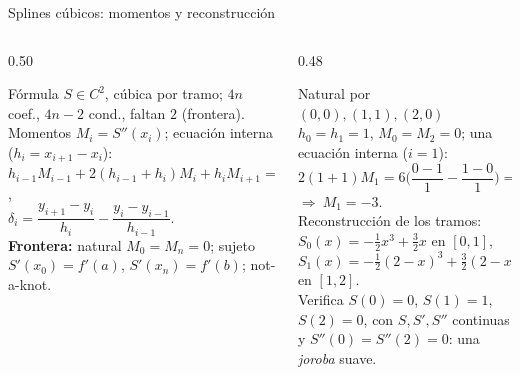 \documentclass[aspectratio=169,10pt]{beamer}
\begin{document}
\begin{frame}{Splines cúbicos: momentos y reconstrucción}
\begin{columns}[T]
\begin{column}{0.50\textwidth}
\begin{cardidea}{Fórmula}{\faSuperscript}
{\footnotesize $S\in C^2$, cúbica por tramo; $4n$ coef., $4n{-}2$ cond., faltan $2$ (frontera). Momentos $M_i=S''(x_i)$; ecuación interna ($h_i=x_{i+1}-x_i$):\\[0.4mm]
$h_{i-1}M_{i-1}+2(h_{i-1}+h_i)M_i+h_iM_{i+1}=6\delta_i$,\\[0.2mm]
$\delta_i=\dfrac{y_{i+1}-y_i}{h_i}-\dfrac{y_i-y_{i-1}}{h_{i-1}}$.\\[1.0mm]
\textbf{Frontera:} natural $M_0{=}M_n{=}0$; sujeto $S'(x_0){=}f'(a)$, $S'(x_n){=}f'(b)$; not-a-knot.}
\end{cardidea}
\end{column}
\begin{column}{0.48\textwidth}
\begin{cardgear}{Natural por $(0,0),(1,1),(2,0)$}{\faCalculator}
{\footnotesize $h_0=h_1=1$, $M_0=M_2=0$; una ecuación interna ($i=1$):\\[0.6mm]
$2(1{+}1)M_1=6\Big(\dfrac{0-1}{1}-\dfrac{1-0}{1}\Big)=-12$\\[0.4mm]
$\Rightarrow\ M_1=-3.$\\[1.4mm]
Reconstrucción de los tramos:\\[0.2mm]
$S_0(x)=-\tfrac12x^3+\tfrac32x$ \quad en $[0,1]$,\\[0.2mm]
$S_1(x)=-\tfrac12(2-x)^3+\tfrac32(2-x)$ \; en $[1,2]$.\\[0.8mm]
Verifica $S(0){=}0$, $S(1){=}1$, $S(2){=}0$, con $S,S',S''$ continuas y $S''(0){=}S''(2){=}0$: una \emph{joroba} suave.}
\end{cardgear}
\end{column}
\end{columns}
\end{frame}
\end{document}
